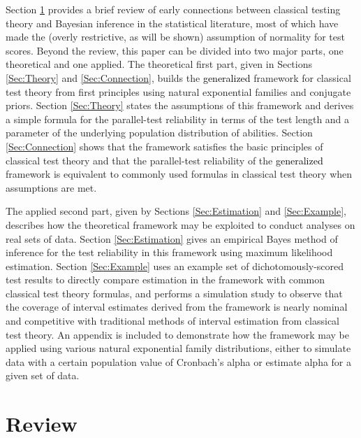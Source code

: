 \documentclass[12pt,epsfig]{article}
\newcommand{\change}[1]{\textcolor{black}{#1}}
\begin{document}
Section \ref{Sec:History} provides a brief review of early connections between classical testing theory and Bayesian inference in the statistical literature, most of which have made the (overly restrictive, as will be shown) assumption of normality for test scores. Beyond the review, this paper can be divided into two major parts, one theoretical and one applied. The theoretical first part, given in Sections \ref{Sec:Theory} and \ref{Sec:Connection}, builds the \change{generalized} framework for classical test theory from first principles using natural exponential families and conjugate priors. Section \ref{Sec:Theory} states the assumptions of this framework and derives a simple formula for the parallel-test reliability in terms of the test length and a parameter of the underlying population distribution of abilities. Section \ref{Sec:Connection} shows that the framework satisfies the basic principles of classical test theory and that the parallel-test reliability of the \change{generalized} framework is equivalent to commonly used formulas in classical test theory when assumptions are met. 

The applied second part, given by Sections \ref{Sec:Estimation} and \ref{Sec:Example}, describes how the theoretical framework may be exploited to conduct analyses on real sets of data. Section \ref{Sec:Estimation} gives an empirical Bayes method of inference for the test reliability in this framework using maximum likelihood estimation. Section \ref{Sec:Example} uses an example set of dichotomously-scored test results to directly compare estimation in the framework with common classical test theory formulas, and performs a simulation study to observe that the coverage of interval estimates derived from the framework is nearly nominal and competitive with traditional methods of interval estimation from classical test theory. An appendix is included to demonstrate how the framework may be applied using various natural exponential family distributions, either to simulate data with a certain population value of Cronbach's alpha or estimate alpha for a given set of data.


\section{Review}
\label{Sec:History}
\end{document}
